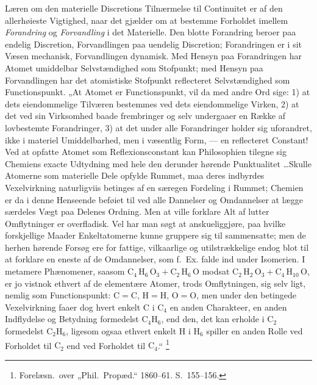 \documentclass[12pt]{book}
\newcommand{\opage}[1]{\marginnote{\footnotesize\textit{[#1]}}}
\begin{document}
Læren om den materielle Discretions Tilnærmelse til Continuitet er af den allerhøieste
Vigtighed, naar det gjælder om at bestemme Forholdet imellem \emph{Forandring} og
\emph{Forvandling} i det Materielle. Den blotte Forandring beroer paa endelig Discretion,
Forvandlingen paa uendelig Discretion; Forandringen er i sit Væsen mechanisk, Forvandlingen
dynamisk. Med Hensyn paa Forandringen har Atomet umiddelbar Selvstændighed som Stofpunkt;
med Hensyn paa Forvandlingen har det atomistiske Stofpunkt reflecteret Selvstændighed som
Functionspunkt. „At Atomet er Functionspunkt, vil da med andre Ord sige: 1) at dets
eiendommelige Tilværen bestemmes ved dets eiendommelige Virken, 2) at det ved sin
Virksomhed baade frembringer og selv undergaaer en Række af lovbestemte Forandringer, 3) at
det under alle Forandringer holder sig uforandret, ikke i materiel Umiddelbarhed, men i
væsentlig Form, — en reflecteret Constant! Ved at opfatte Atomet som Reflexionsconstant kan
Philosophien tilegne sig Chemiens exacte Udtydning med hele den derunder hørende
Punktualitet \ldots Skulle Atomerne som materielle Dele opfylde Rummet, maa deres indbyrdes
Vexelvirkning naturligviis betinges af en særegen Fordeling i Rummet; Chemien er da i denne
Henseende beføiet
\opage{368} til ved alle Dannelser og Omdannelser at lægge særdeles Vægt paa Delenes Ordning. Men at
ville forklare Alt af lutter Omflytninger er overfladisk. Vel har man søgt at
anskueliggjøre, paa hvilke forskjellige Maader Enkeltatomerne kunne gruppere sig til
sammensatte; men de herhen hørende Forsøg ere for fattige, vilkaarlige og utilstrækkelige
endog blot til at forklare en eneste af de Omdannelser, som f.\ Ex. falde ind under
Isomerien. I metamere Phænomener, saasom $\mathrm{C}_{4}\,\mathrm{H}_{6}\,\mathrm{O}_{3} +
\mathrm{C}_{2}\,\mathrm{H}_{6}\,\mathrm{O}$ modsat $\mathrm{C}_{2}\,\mathrm{H}_{2}\,\mathrm{O}_{3}
+ \mathrm{C}_{4}\,\mathrm{H}_{10}\,\mathrm{O}$, er jo vistnok ethvert af de elementære
Atomer, trods Omflytningen, sig selv ligt, nemlig som Functionspunkt: $\mathrm{C} =
\mathrm{C}$, $\mathrm{H} = \mathrm{H}$, $\mathrm{O} = \mathrm{O}$, men under den betingede
Vexelvirkning faaer dog hvert enkelt $\mathrm{C}$ i $\mathrm{C}_{4}$ en anden Charakteer, en
anden Indflydelse og Betydning formedelst $\mathrm{C}_{4}\mathrm{H}_{6}$, end den, det kan
erholde i $\mathrm{C}_{2}$ formedelst $\mathrm{C}_{2}\mathrm{H}_{6}$, ligesom ogsaa ethvert
enkelt $\mathrm{H}$ i $\mathrm{H}_{6}$ spiller en anden Rolle ved Forholdet til
$\mathrm{C}_{2}$ end ved Forholdet til $\mathrm{C}_{4}$.“%
\footnote{Forelæsn.\ over „Phil.\ Propæd.“ 1860--61. S.~155--156.}
\end{document}

